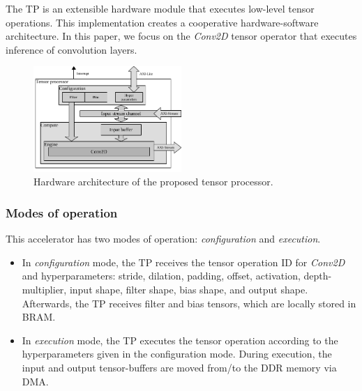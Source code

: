 The TP is an extensible hardware module that executes low-level tensor operations. This implementation creates a cooperative hardware-software architecture. In this paper, we focus on the \emph{Conv2D} tensor operator that executes inference of convolution layers.

\begin{figure}[t!]
	\centering
	\includegraphics[width=0.5\textwidth]{../figures/accelerator.pdf}
	\caption{Hardware architecture of the proposed tensor processor.}
	\label{fig:accelerator}
\end{figure}
\subsubsection{\textbf{Modes of operation}}
This accelerator has two modes of operation: \emph{configuration} and \emph{execution}.
\begin{itemize}
	\item In \emph{configuration} mode, the TP receives the tensor operation ID for \emph{Conv2D} and hyperparameters: stride, dilation, padding, offset, activation, depth-multiplier, input shape, filter shape, bias shape, and output shape. Afterwards, the TP receives filter and bias tensors, which are locally stored in BRAM.
	
	\item In \emph{execution} mode, the TP executes the tensor operation according to the hyperparameters given in the configuration mode. During execution, the input and output tensor-buffers are moved from/to the DDR memory via DMA.
\end{itemize}
